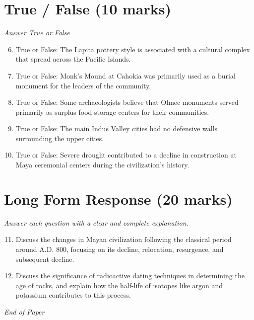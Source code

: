 \documentclass[12pt]{article}
\begin{document}
\section*{True / False (10 marks)}
\textit{Answer True or False}
\begin{enumerate}[label=\arabic*.]
\setcounter{enumi}{5}
\item True or False: The Lapita pottery style is associated with a cultural complex that spread across the Pacific Islands.
\item True or False: Monk's Mound at Cahokia was primarily used as a burial monument for the leaders of the community.
\item True or False: Some archaeologists believe that Olmec monuments served primarily as surplus food storage centers for their communities.
\item True or False: The main Indus Valley cities had no defensive walls surrounding the upper cities.
\item True or False: Severe drought contributed to a decline in construction at Maya ceremonial centers during the civilization's history.
\end{enumerate}

\section*{Long Form Response (20 marks)}
\textit{Answer each question with a clear and complete explanation.}
\begin{enumerate}[label=\arabic*.]
\setcounter{enumi}{10}
\item Discuss the changes in Mayan civilization following the classical period around A.D. 800, focusing on its decline, relocation, resurgence, and subsequent decline.
\item Discuss the significance of radioactive dating techniques in determining the age of rocks, and explain how the half-life of isotopes like argon and potassium contributes to this process.
\end{enumerate}

\vfill
\noindent\textit{End of Paper}
\end{document}
